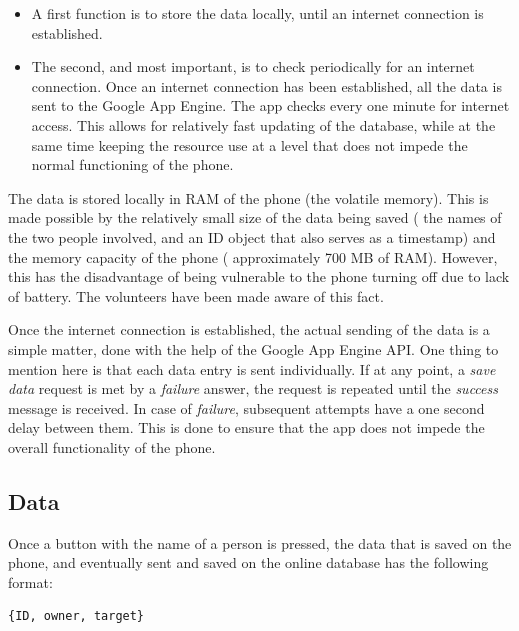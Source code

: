 \begin{itemize}
  \item A first function is to store the data locally, until an internet connection is established.
  \item The second, and most important, is to check periodically for an internet connection. Once an internet connection has been established, all the data is sent to the Google App Engine. The app checks every one minute for internet access. This allows for relatively fast updating of the database, while at the same time keeping the resource use at a level that does not impede the normal functioning of the phone.
\end{itemize}

The data is stored locally in RAM of the phone (the volatile memory). This is made possible by the relatively small size of the data being saved ( the names of the two people involved, and an ID object that also serves as a timestamp) and the memory capacity of the phone ( approximately 700 MB of RAM). However, this has the disadvantage of being vulnerable to the phone turning off due to lack of battery. The volunteers have been made aware of this fact. 

Once the internet connection is established, the actual sending of the data is a simple matter, done with the help of the Google App Engine API. One thing to mention here is that each data entry is sent individually. If at any point, a \textit{save data} request is met by a \textit{failure} answer, the request is repeated until the \textit{success} message is received. In case of \textit{failure}, subsequent attempts have a one second delay between them. This is done to ensure that the app does not impede the overall functionality of the phone.



\subsection{Data}

Once a button with the name of a person is pressed, the data that is saved on the phone, and eventually sent and saved on the online database has the following format:

\begin{verbatim}
{ID, owner, target}
\end{verbatim}

